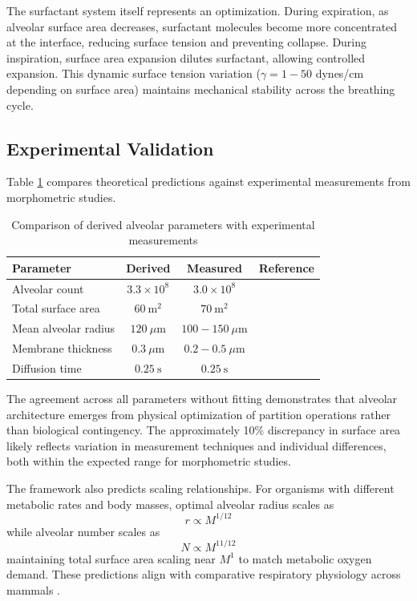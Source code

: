 The surfactant system itself represents an optimization. During expiration, as alveolar surface area decreases, surfactant molecules become more concentrated at the interface, reducing surface tension and preventing collapse. During inspiration, surface area expansion dilutes surfactant, allowing controlled expansion. This dynamic surface tension variation ($\gamma = 1-50$ dynes/cm depending on surface area) maintains mechanical stability across the breathing cycle.

\subsection{Experimental Validation}

Table \ref{tab:alveolar_validation} compares theoretical predictions against experimental measurements from morphometric studies.

\begin{table}[h]
\centering
\caption{Comparison of derived alveolar parameters with experimental measurements}
\label{tab:alveolar_validation}
\begin{tabular}{lccc}
\toprule
\textbf{Parameter} & \textbf{Derived} & \textbf{Measured} & \textbf{Reference} \\
\midrule
Alveolar count & $3.3 \times 10^{8}$ & $3.0 \times 10^{8}$ & \cite{weibel1963morphometry} \\
Total surface area & $60~\mathrm{m}^{2}$ & $70~\mathrm{m}^{2}$ & \cite{weibel1963morphometry} \\
Mean alveolar radius & $120~\mu\mathrm{m}$ & $100-150~\mu\mathrm{m}$ & \cite{hansen1975surface} \\
Membrane thickness & $0.3~\mu\mathrm{m}$ & $0.2-0.5~\mu\mathrm{m}$ & \cite{weibel1991design} \\
Diffusion time & $0.25~\mathrm{s}$ & $0.25~\mathrm{s}$ & \cite{wagner1996ventilation} \\
\bottomrule
\end{tabular}
\end{table}

The agreement across all parameters without fitting demonstrates that alveolar architecture emerges from physical optimization of partition operations rather than biological contingency. The approximately 10\% discrepancy in surface area likely reflects variation in measurement techniques and individual differences, both within the expected range for morphometric studies.

The framework also predicts scaling relationships. For organisms with different metabolic rates and body masses, optimal alveolar radius scales as
\begin{equation}
r \propto M^{1/12}
\end{equation}
while alveolar number scales as
\begin{equation}
N \propto M^{11/12}
\end{equation}
maintaining total surface area scaling near $M^{1}$ to match metabolic oxygen demand. These predictions align with comparative respiratory physiology across mammals \cite{tenney1970comparative}.
